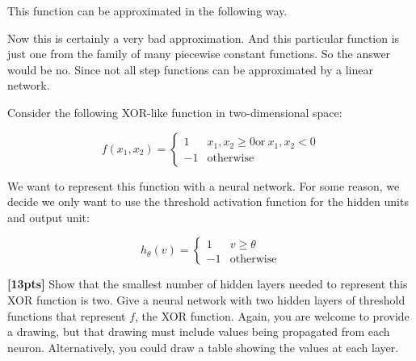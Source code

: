 \documentclass[paper=a4, fontsize=11pt]{scrartcl} %
\numberwithin{figure}{section} %
\numberwithin{table}{section} %
\begin{document}

This function can be approximated in the following way. \\


\par Now this is certainly a very bad approximation. And this particular function is just one from the family of many piecewise constant functions. So the answer would be no. Since not all step functions can be approximated by a linear network. 

Consider the following XOR-like function in two-dimensional space:

$$
f(x_1, x_2) = \begin{cases}
	1 & x_1, x_2 \ge 0 \textrm{or}\ x_1, x_2 < 0 \\
	-1 & \textrm{otherwise}
\end{cases}
$$

We want to represent this function with a neural network. For some reason, we decide we only want to use the threshold activation function for the hidden units and output unit:

$$
h_{\theta}(v) = \begin{cases}
	1 & v \ge \theta \\
	-1 & \textrm{otherwise}
\end{cases}
$$

\textbf{[13pts]} Show that the smallest number of hidden layers needed to represent this XOR function is two. Give a neural network with two hidden layers of threshold functions that represent $f$, the XOR function. Again, you are welcome to provide a drawing, but that drawing must include values being propagated from each neuron. Alternatively, you could draw a table showing the values at each layer.
\end{document}
